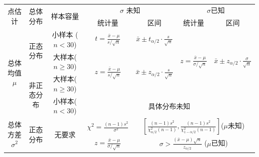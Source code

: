 \documentclass[a4paper]{ctexart}    %
\begin{document}
	\begin{table}[htbp!]
		\centering
		\renewcommand\arraystretch{1.8}
		\begin{tabular}{|c|c|c|c|c|c|c|}
			\hline
			\multirow{2}{*}{点估计} & \multirow{2}{*}{总体分布} & \multirow{2}{*}{样本容量} & \multicolumn{2}{|c|}{$\sigma$ 未知} & \multicolumn{2}{|c|}{$\sigma$已知} \\
			\cline{4-7}
			& & & 统计量 & 区间 & 统计量 & 区间 \\ \hline
			\multirow{4}{*}{总体均值$\mu$} & \multirow{2}{*}{正态分布} & {小样本 ($ n < 30 $)} & $ t = \frac{\bar{x} - \mu}{s/\sqrt{n}} $ & $ \bar{x} \pm t_{\alpha/2} \cdot \frac{s}{\sqrt{n}} $ & \multirow{3}{*}{$ z=\frac{\bar{x}-\mu}{\sigma / \sqrt{n}} $} & \multirow{3}{*}{$ \bar{x} \pm z_{\alpha / 2} \cdot \frac{\sigma}{\sqrt{n}} $} \\
			\cline{3-5}
			& & 大样本($ n \geq 30 $) & \multirow{2}{*}{$ z= \frac{\bar{x}-\mu}{s/\sqrt{n}} $} & \multirow{2}{*}{$\bar{x} \pm z_{\alpha/2} \cdot \frac{s}{\sqrt{n}}$} & & \\
			\cline{2-3}
			 & \multirow{2}{*}{非正态分布} & 大样本($ n \geq 30 $) & & & & \\
			\cline{3-7}
			 & & 小样本($ n < 30 $) & \multicolumn{4}{|c|}{具体分布未知} \\
			\cline{1-7} 
			\multirow{2}{*}{总体方差$ \sigma^2 $} & \multirow{2}{*}{正态分布} & \multirow{2}{*}{无要求} & $ \chi^2 = \frac{(n-1)s^2}{\sigma^2} $ & \multicolumn{3}{|c|}{$ \left[ \frac{(n-1)s^2}{\chi_{\alpha / 2}^2(n-1)} , \frac{(n-1)s^2}{\chi_{1-\alpha / 2}^2(n-1)}\right] $\quad ($ \mu $未知)} \\
			\cline{4-7}
			& & & $ z = \frac{\bar{x} - \mu}{\sigma / \sqrt{n}} $ & \multicolumn{3}{|c|}{$ \sigma > \frac{(\bar{x} - \mu)\sqrt{n}}{z_{\alpha / 2}} $ \quad ($\mu$已知)} \\
			\cline{1-7}
		\end{tabular}
	\end{table}
\end{document}
